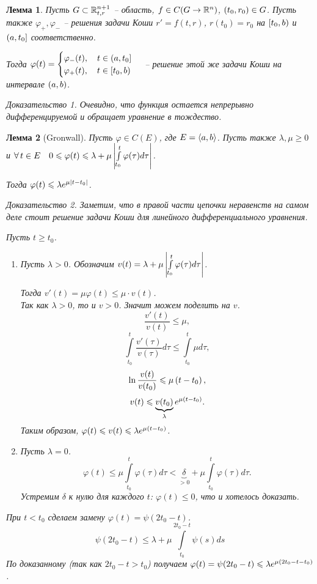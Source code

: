 \documentclass[a5paper, 10pt]{article}
\theoremstyle{definition}
\theoremstyle{plain}
\newtheorem{Lem}{Лемма}
\theoremstyle{remark}
\newtheorem*{Proof}{Доказательство}
\begin{document}
	\begin{Lem}
		Пусть $G \subset \mathbb{R}^{n+1}_{t,r}$ -- область, $f \in C(G \rightarrow \mathbb{R}^n)$, $\left(t_0, r_0\right) \in G$. Пусть также $\varphi_+, \varphi_-$ -- решения задачи Коши $r'=f(t,r)$, $r(t_0)=r_0$ на $\left[t_0,b\right)$ и $\left(a,t_0\right]$ соответственно.
		
		Тогда $\varphi(t) = \begin{cases}
			\varphi_-(t), \quad t\in \left(a,t_0\right] \\
			\varphi_+(t), \quad t\in \left[t_0,b\right) \\
		\end{cases}$ -- решение этой же задачи Коши на интервале $\left(a,b\right)$.
	\begin{Proof}
		Очевидно, что функция остается непрерывно дифференцируемой и обращает уравнение в тождество.
	\end{Proof}
	\end{Lem}
	 \begin{Lem}[Gronwall]
	 	Пусть $\varphi \in C(E)$, где $E=\left\langle a,b\right\rangle$. Пусть также $\lambda, \mu \geqslant 0$ и $\forall \, t \in E \quad 0 \leqslant \varphi(t) \leqslant \lambda + \mu \left|\int\limits_{t_0}^t \varphi(\tau)d\tau\right|$. 
	 	
	 	Тогда $\varphi(t) \leqslant \lambda e^{\mu\left|t-t_0\right|}$.
	 	\begin{Proof}
	 		Заметим, что в правой части цепочки неравенств на самом деле стоит решение задачи Коши для линейного дифференциального уравнения. 
	 		
	 		Пусть $t\geqslant t_0$.
	 		\begin{enumerate}
	 			\item Пусть $\lambda>0$. Обозначим $v(t) = \lambda + \mu \left|\int\limits_{t_0}^t \varphi(\tau)d\tau\right|$.
	 			
	 			Тогда $v'(t) = \mu \varphi(t) \leqslant \mu \cdot v(t)$.\\
	 			Так как $\lambda>0$, то и $v>0$. Значит можем поделить на $v$. 
	 			\[
	 			\frac{v'(t)}{v(t)} \leqslant \mu,
	 			\]
	 			\[
	 			\int\limits_{t_0}^t \frac{v'(\tau)}{v(\tau)} d \tau \leqslant \int\limits_{t_0}^t\mu d\tau,
	 			\]
	 			\[
	 			\ln \frac{v(t)}{v(t_0)} \leqslant \mu \left(t-t_0\right),
	 			\]
	 			\[
	 			v(t) \leqslant \underbrace{v(t_0)}_{\lambda} e^{\mu\left(t-t_0\right)}.
	 			\]
	 			Таким образом, $\varphi(t) \leqslant v(t) \leqslant\lambda e^{\mu\left(t-t_0\right)}$.
	 			\item Пусть $\lambda=0$.\\
	 			\[
	 			\varphi(t) \leqslant \mu \int\limits_{t_0}^t \varphi(\tau)d\tau < \underbrace{\delta}_{>0} + \mu \int\limits_{t_0}^t \varphi(\tau)d\tau.
	 			\]
	 			Устремим $\delta$ к нулю для каждого $t$: $\varphi(t) \leqslant 0$, что и хотелось доказать.
	 		\end{enumerate}
 			При $t<t_0$ сделаем замену $\varphi(t) = \psi(2t_0 - t)$.
 			\[
 			\psi(2t_0-t) \leqslant \lambda + \mu \int\limits_{t_0}^{2t_0-t} \psi(s) ds
 			\]
 			По доказанному (так как $2t_0-t>t_0$) получаем $\varphi(t) = \psi(2t_0-t) \leqslant \lambda e^{\mu \left(2t_0-t-t_0\right)}$.
	 	\end{Proof}
	 \end{Lem}
 
\end{document}
